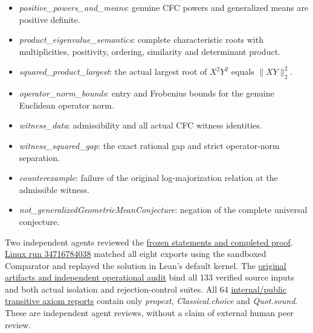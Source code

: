 \documentclass[11pt,a4paper]{article}
\providecommand{\tightlist}{\setlength{\itemsep}{0pt}\setlength{\parskip}{0pt}}
\begin{document}
\begin{itemize}
\tightlist
\item
  \textit{positive\_powers\_and\_means}: genuine CFC powers and
  generalized means are positive definite.
\item
  \textit{product\_eigenvalue\_semantics}: complete characteristic roots
  with multiplicities, positivity, ordering, similarity and determinant
  product.
\item
  \textit{squared\_product\_largest}: the actual largest root of
  \(X^2Y^2\) equals \(\|XY\|_2^2\).
\item
  \textit{operator\_norm\_bounds}: entry and Frobenius bounds for the
  genuine Euclidean operator norm.
\item
  \textit{witness\_data}: admissibility and all actual CFC witness
  identities.
\item
  \textit{witness\_squared\_gap}: the exact rational gap and strict
  operator-norm separation.
\item
  \textit{counterexample}: failure of the original log-majorization
  relation at the admissible witness.
\item
  \textit{not\_generalizedGeometricMeanConjecture}: negation of the
  complete universal conjecture.
\end{itemize}

Two independent agents reviewed the
\href{https://github.com/ajt60gaibb/OpenProblemsInNLA/blob/main/matrix-inequalities-and-norms/MI-23/lean/reviews}{frozen
statements and completed proof}.
\href{https://github.com/sgstepaniants/OpenProblemsInNLA/actions/runs/34716784038}{Linux
run 34716784038} matched all eight exports using the sandboxed
Comparator and replayed the solution in Lean's default kernel. The
\href{https://github.com/ajt60gaibb/OpenProblemsInNLA/blob/main/matrix-inequalities-and-norms/MI-23/lean/verification/linux-2026-09-12}{original
artifacts and independent operational audit} bind all 133 verified
source inputs and both actual isolation and rejection-control suites.
All 64
\href{https://github.com/ajt60gaibb/OpenProblemsInNLA/blob/main/matrix-inequalities-and-norms/MI-23/lean/verification/linux-2026-09-12/axiom-verification.json}{internal/public
transitive axiom reports} contain only \textit{propext},
\textit{Classical.choice} and \textit{Quot.sound}. These are independent
agent reviews, without a claim of external human peer review.
\end{document}
